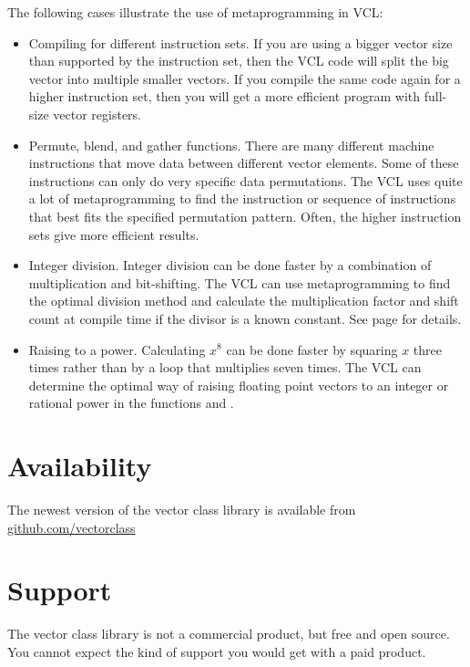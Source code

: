 \documentclass[vcl_manual.tex]{subfiles}
\begin{document}
The following cases illustrate the use of metaprogramming in VCL:
\begin{itemize}
\item Compiling for different instruction sets. If you are using a bigger vector size than supported by the instruction set, then the VCL code will split the big vector into multiple smaller vectors. If you compile the same code again for a higher instruction set, then you will get a more efficient program with full-size vector registers.

\item Permute, blend, and gather functions. There are many different machine instructions that move data between different vector elements. Some of these instructions can only do very specific data permutations. The VCL uses quite a lot of metaprogramming to find the instruction or sequence of instructions that best fits the specified permutation pattern. Often, the higher instruction sets give more efficient results.

\item Integer division. Integer division can be done faster by a combination of multiplication and bit-shifting. The VCL can use metaprogramming to find the optimal division method and calculate the multiplication factor and shift count at compile time if the divisor is a known constant. 
See page \pageref{HowVCLUsesMetaprogramming} for details.

\item Raising to a power. Calculating $x^8$ can be done faster by squaring $x$ three times rather than by a loop that multiplies seven times. The VCL can determine the optimal way of raising floating point vectors to an integer or rational power in the functions  and .
\end{itemize}

\section{Availability} \label{Availability}
The newest version of the vector class library is available from 
\href{https://github.com/vectorclass}{github.com/vectorclass}


\section{Support} \label{Support}
The vector class library is not a commercial product, but free and open source. 
You cannot expect the kind of support you would get with a paid product. 
\end{document}
